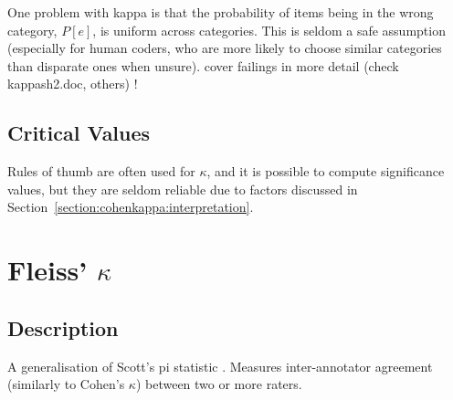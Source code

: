 \documentclass[11pt]{article}
\begin{document}
One problem with kappa is that the probability of items being in the wrong category, $P[e]$, is uniform across categories.  This is seldom a safe assumption (especially for human coders, who are more likely to choose similar categories than disparate ones when unsure).
{\color{red} cover failings in more detail (check kappash2.doc, others) !}

\subsection{Critical Values}
Rules of thumb are often used for $\kappa$, and it is possible to compute significance values, but they are seldom reliable due to factors discussed in Section~\ref{section:cohenkappa:interpretation}.





\section{Fleiss' $\kappa$} %
\subsection{Description}
A generalisation of Scott's pi statistic %
.  Measures inter-annotator agreement (similarly to Cohen's $\kappa$) between two or more raters.
\end{document}
